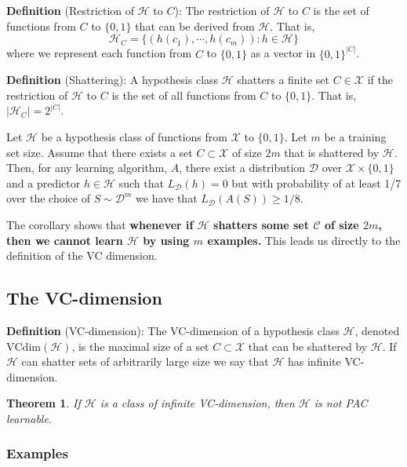 \documentclass{article}
\newtheorem{theorem}{Theorem}
\begin{document}
\noindent\textbf{Definition} (Restriction of $\mathcal{H}$ to $C$): The restriction of $\mathcal{H}$ to $C$ is the set of functions from $C$ to $\{0,1\}$ that can be derived from $\mathcal{H}$. That is,
	\begin{equation}
	\mathcal{H}_C=\{(h(c_1),\cdots,h(c_m)):h\in\mathcal{H}\}
	\end{equation}
where we represent each function from $C$ to $\{0,1\}$ as a vector in $\{0,1\}^{|C|}$.

\noindent\textbf{Definition} (Shattering): A hypothesis class $\mathcal{H}$ shatters a finite set $C\in\mathcal{X}$ if the restriction of $\mathcal{H}$ to $C$ is the set of all functions from $C$ to $\{0,1\}$. That is, $|\mathcal{H}_C|=2^{|C|}$.

\begin{corollary*} Let $\mathcal{H}$ be a hypothesis class of functions from $\mathcal{X}$ to $\{0, 1\}$. Let $m$ be a training set size. Assume that there exists a set $C\subset\mathcal{X}$ of size $2m$ that is shattered by $\mathcal{H}$. Then, for any learning algorithm, $A$, there exist a distribution $\mathcal{D}$ over $\mathcal{X} \times \{0, 1\}$ and a predictor $h\in\mathcal{H}$ such that $L_{\mathcal{D}}(h) = 0$ but with probability of at least 1/7 over the choice of $S\sim\mathcal{D}^m$ we have that $L_\mathcal{D}(A(S))\geq 1/8$.
\end{corollary*}

The corollary shows that \textbf{whenever if $\mathcal{H}$ shatters some set $\mathcal{C}$ of size $2m$, then we cannot learn $\mathcal{H}$ by using $m$ examples.} This leads us directly to the definition of the VC dimension.

\subsection{The VC-dimension}
\textbf{Definition} (VC-dimension): The VC-dimension of a hypothesis class $\mathcal{H}$, denoted $\mathrm{VCdim}(\mathcal{H})$, is the maximal size of a set $C\subset\mathcal{X}$ that can be shattered by $\mathcal{H}$. If $\mathcal{H}$ can shatter sets of arbitrarily large size we say that $\mathcal{H}$ has infinite VC-dimension.

\begin{theorem}
If $\mathcal{H}$ is a class of infinite VC-dimension, then $\mathcal{H}$ is not PAC learnable.
\end{theorem}

\subsubsection{Examples}
\end{document}
